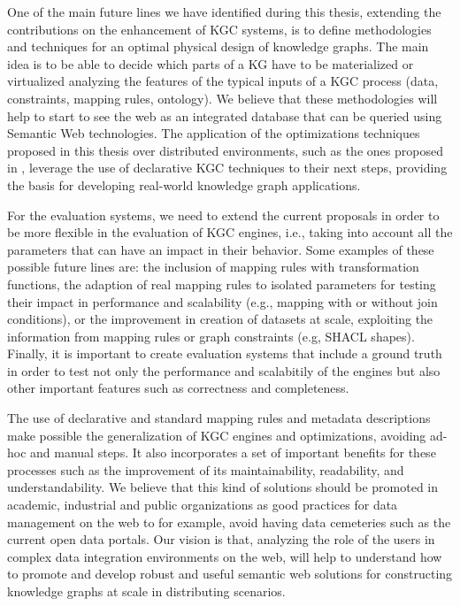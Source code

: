 One of the main future lines we have identified during this thesis, extending the contributions on the enhancement of KGC systems, is to define methodologies and techniques for an optimal physical design of knowledge graphs. The main idea is to be able to decide which parts of a KG have to be materialized or virtualized analyzing the features of the typical inputs of a KGC process (data, constraints, mapping rules, ontology). We believe that these methodologies will help to start to see the web as an integrated database that can be queried using Semantic Web technologies. The application of the optimizations techniques proposed in this thesis over distributed environments, such as the ones proposed in \citep{endris2019ontario,mami2019squerall}, leverage the use of declarative KGC techniques to their next steps, providing the basis for developing real-world knowledge graph applications.

For the evaluation systems, we need to extend the current proposals in order to be more flexible in the evaluation of KGC engines, i.e., taking into account all the parameters that can have an impact in their behavior. Some examples of these possible future lines are: the inclusion of mapping rules with transformation functions, the adaption of real mapping rules to isolated parameters for testing their impact in performance and scalability (e.g., mapping with or without join conditions), or the improvement in creation of datasets at scale, exploiting the information from mapping rules or graph constraints (e.g, SHACL shapes). Finally, it is important to create evaluation systems that include a ground truth in order to test not only the performance and scalabitily of the engines but also other important features such as correctness and completeness.

The use of declarative and standard mapping rules and metadata descriptions make possible the generalization of KGC engines and optimizations, avoiding ad-hoc and manual steps. It also incorporates a set of important benefits for these processes such as the improvement of its maintainability, readability, and understandability. We believe that this kind of solutions should be promoted in academic, industrial and public organizations as good practices for data management on the web to for example, avoid having data cemeteries such as the current open data portals. Our vision is that, analyzing the role of the users in complex data integration environments on the web, will help to understand how to promote and develop robust and useful semantic web solutions for constructing knowledge graphs at scale in distributing scenarios.


